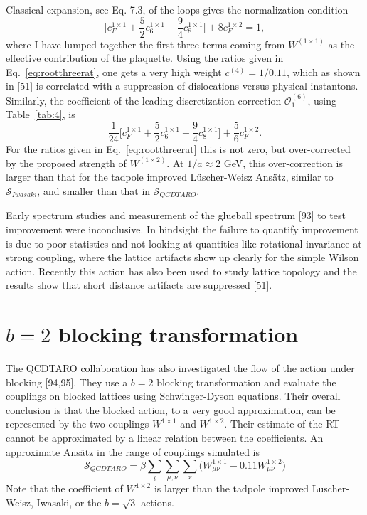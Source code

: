 Classical expansion, see Eq. 7.3, of the loops gives the normalization
condition
\begin{equation}
\bigg[c_F^{1\times1} + \frac{5}{2}c_6^{1\times1}
    + \frac{9}{4}c_8^{1\times1}\bigg] + 8c_F^{1\times2} = 1,
\end{equation}
where I have lumped together the first three terms coming from
$W^{(1\times1)}$ as the effective contribution of the plaquette.  Using
the ratios given in Eq.~\ref{eq:rootthreerat}, one gets a very high
weight $c^{(4)} = 1/0.11$, which as shown in [51] is correlated with a
suppression of dislocations versus physical instantons.  Similarly, the
coefficient of the leading discretization correction
$\mathcal{O}_1^{(6)}$, using Table~\ref{tab:4}, is
\begin{equation}
\frac{1}{24}\bigg[c_F^{1\times1} + \frac{5}{2}c_6^{1\times1}
    + \frac{9}{4}c_8^{1\times1}\bigg]
    + \frac{5}{6}c_F^{1\times2}.
\end{equation}
For the ratios given in Eq.~\ref{eq:rootthreerat} this is not zero, but
over-corrected by the proposed strength of $W^{(1\times2)}$.  At
$1/a \approx 2$ GeV, this over-correction is larger than that for the
tadpole improved L\"uscher-Weisz Ans\"atz, similar to
$\mathcal{S}_{Iwasaki}$, and smaller than that in
$\mathcal{S}_{QCDTARO}$.

Early spectrum studies and measurement of the glueball spectrum [93] to
test improvement were inconclusive.  In hindsight the failure to
quantify improvement is due to poor statistics and not looking at
quantities like rotational invariance at strong coupling, where the
lattice artifacts show up clearly for the simple Wilson action.
Recently this action has also been used to study lattice topology and
the results show that short distance artifacts are suppressed [51].

\section{$b=2$ blocking transformation}

The QCDTARO collaboration has also investigated the flow of the action
under blocking [94,95].  They use a $b = 2$ blocking transformation and
evaluate the couplings on blocked lattices using Schwinger-Dyson
equations.  Their overall conclusion is that the blocked action, to a
very good approximation, can be represented by the two couplings
$W^{1\times1}$ and $W^{1\times2}$.  Their estimate of the RT cannot be
approximated by a linear relation between the coefficients.  An
approximate Ans\"atz in the range of couplings simulated is
\begin{equation}
\mathcal{S}_{QCDTARO} = \beta\sum_i\sum_{\mu,\nu}\sum_x
    \bigg(W^{1\times1}_{\mu\nu} - 0.11W^{1\times2}_{\mu\nu}\bigg)
\end{equation}
Note that the coefficient of $W^{1\times2}$ is larger than the tadpole
improved Luscher-Weisz, Iwasaki, or the $b = \sqrt{3}$ actions.

